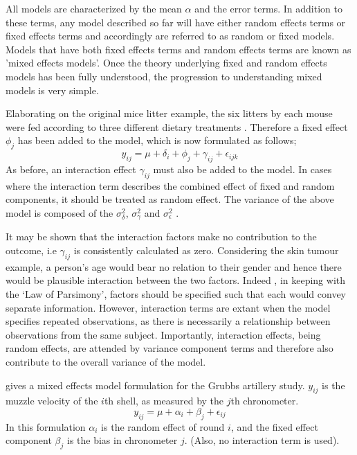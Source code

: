 \documentclass[12pt, a4paper]{report}
\theoremstyle{plain}
\theoremstyle{definition}
\theoremstyle{remark}
\begin{document}

All models are characterized by the mean $\alpha$ and the error
terms. In addition to these terms, any model described so far will
have either random effects terms or fixed effects terms and
accordingly are referred to as random or fixed models. Models that
have both fixed effects terms and random effects terms are known
as 'mixed effects models'. Once the theory underlying fixed and
random effects models has been fully understood, the progression
to understanding mixed models is very simple.

Elaborating on the original mice litter example, the six litters
by each mouse were fed according to three different dietary
treatments \citep{Searle}. Therefore a fixed effect $\phi_{j}$ has
been added to the model, which is now formulated as follows;
\begin{equation}
y_{ij} = \mu + \delta_{i} + \phi_{j} + \gamma_{ij} +
\epsilon_{ijk}
\end{equation}
As before, an interaction effect $\gamma_{ij}$ must also be added
to the model. In cases where the interaction term describes the
combined effect of fixed and random components, it should be
treated as random effect. The variance of the above model is
composed of the $\sigma^{2}_{\delta}$, $\sigma^{2}_{\gamma}$ and
$\sigma^{2}_{\epsilon}$ .


It may be shown that the interaction factors make no contribution
to the outcome, i.e $\gamma_{ij}$ is consistently calculated as
zero. Considering the skin tumour example, a person's age would
bear no relation to their gender and hence there would be
plausible interaction between the two factors. Indeed , in keeping
with the `Law of Parsimony', factors should be specified such that
each would convey separate information. However, interaction terms
are extant when the model specifies repeated observations, as
there is necessarily a relationship between observations from the
same subject. Importantly, interaction effects, being random
effects, are attended by variance component terms and therefore
also contribute to the overall variance of the model.

\citet{Searle} gives a mixed effects model formulation for the
Grubbs artillery study. $y_{ij}$ is the muzzle velocity of the
$i$th shell, as measured by the $j$th chronometer.
\begin{equation}
y_{ij} = \mu + \alpha_{i} + \beta_{j}  + \epsilon_{ij}
\end{equation}
In this formulation $\alpha_{i}$ is the random effect of round
$i$, and the fixed effect component $\beta_{j}$ is the bias in
chronometer $j$. (Also, no interaction term is used).
\end{document}
